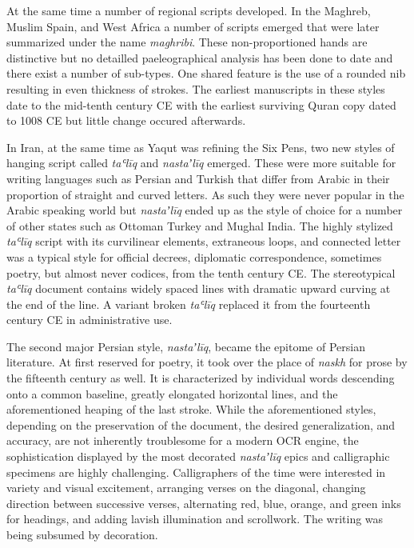 At the same time a number of regional scripts developed. In the Maghreb, Muslim
Spain, and West Africa a number of scripts emerged that were later summarized
under the name \emph{maghribi}. These non-proportioned  hands are distinctive
but no detailled paeleographical analysis has been done to date and there exist
a number of sub-types. One shared feature is the use of a rounded nib resulting
in even thickness of strokes\cite[pg. 147-148]{gacek2009arabic}.  The earliest
manuscripts in these styles date to the mid-tenth century CE with the earliest
surviving Quran copy dated to 1008 CE but little change occured
afterwards\cite[pg. 566]{blair2006islamic}.

In Iran, at the same time as Yaqut was refining the Six Pens, two new styles of
hanging script called \emph{taʿlīq} and \emph{nastaʼlīq} emerged. These were
more suitable for writing languages such as Persian and Turkish that differ
from Arabic in their proportion of straight and curved letters. As such they
were never popular in the Arabic speaking world but \emph{nastaʼlīq} ended up
as the style of choice for a number of other states such as Ottoman Turkey and
Mughal India. The highly stylized \emph{taʿlīq} script with its curvilinear
elements, extraneous loops, and connected letter was a typical style for
official decrees, diplomatic correspondence, sometimes poetry, but almost never
codices, from the tenth century CE. The stereotypical \emph{taʿlīq} document
contains widely spaced lines with dramatic upward curving at the end of the
line. A variant broken \emph{taʿlīq} replaced it from the fourteenth century CE
in administrative use\cite[pg. 270-273]{blair2006islamic}.

The second major Persian style, \emph{nastaʼlīq}, became the epitome of Persian
literature. At first reserved for poetry, it took over the place of
\emph{naskh} for prose by the fifteenth century as well. It is characterized by
individual words descending onto a common baseline, greatly elongated
horizontal lines, and the aforementioned heaping of the last stroke\cite[pg.
166-167]{gacek2009arabic}. While the aforementioned styles, depending on the
preservation of the document, the desired generalization, and accuracy, are not
inherently troublesome for a modern OCR engine, the sophistication displayed by
the most decorated \emph{nastaʼlīq} epics and calligraphic specimens are highly
challenging. Calligraphers of the time were interested in variety and visual
excitement, arranging verses on the diagonal, changing direction between
successive verses, alternating red, blue, orange, and green inks for headings,
and adding lavish illumination and scrollwork. The writing was being subsumed
by decoration\cite[pg. 436]{blair2006islamic}. 

